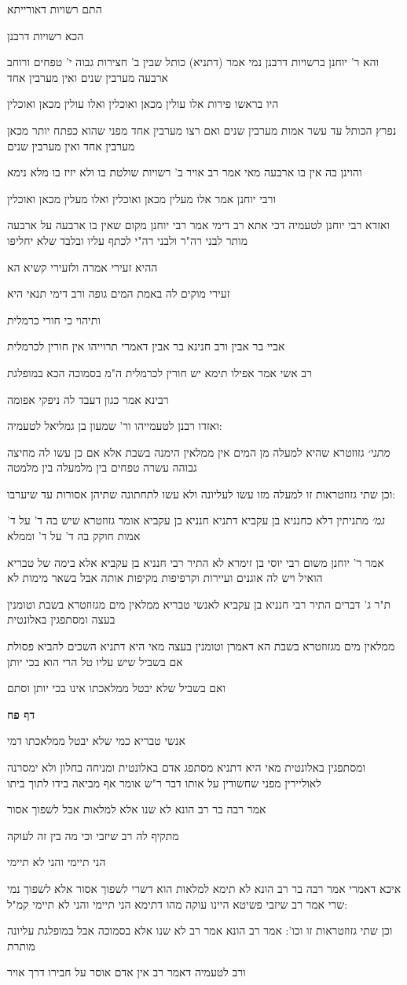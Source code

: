 \documentclass[12pt, openany]{book}
\newcommand{\sethebfont}{
\fontsize{10.5pt}{21.0pt} \selectfont
}
\newcommand{\textblock}[1]{
{\sethebfont #1\\}	
}
\newcommand{\sectname}{}
\newcommand{\newsection}[1]{
	\addcontentsline{toc}{section}{#1}
	\renewcommand{\sectname}{#1}	
	\vspace{-\baselineskip}
	\begin{center}
		\textbf{%
\fontsize{16pt}{16pt}\selectfont
			#1}
	\end{center}
	\vspace{-\baselineskip}
	\nopagebreak
}
\begin{document}
\textblock{התם רשויות דאורייתא}
\textblock{הכא רשויות דרבנן}
\textblock{והא ר' יוחנן ברשויות דרבנן נמי אמר (דתניא) כותל שבין ב' חצירות גבוה י' טפחים ורוחב ארבעה מערבין שנים ואין מערבין אחד}
\textblock{היו בראשו פירות אלו עולין מכאן ואוכלין ואלו עולין מכאן ואוכלין}
\textblock{נפרץ הכותל עד עשר אמות מערבין שנים ואם רצו מערבין אחד מפני שהוא כפתח יותר מכאן מערבין אחד ואין מערבין שנים}
\textblock{והוינן בה אין בו ארבעה מאי אמר רב אויר ב' רשויות שולטת בו ולא יזיז בו מלא נימא}
\textblock{ורבי יוחנן אמר אלו מעלין מכאן ואוכלין ואלו מעלין מכאן ואוכלין}
\textblock{ואזדא רבי יוחנן לטעמיה דכי אתא רב דימי אמר רבי יוחנן מקום שאין בו ארבעה על ארבעה מותר לבני רה"ר ולבני רה"י לכתף עליו ובלבד שלא יחליפו}
\textblock{ההיא זעירי אמרה ולזעירי קשיא הא}
\textblock{זעירי מוקים לה באמת המים גופה ורב דימי תנאי היא}
\textblock{ותיהוי כי חורי כרמלית}
\textblock{אביי בר אבין ורב חנינא בר אבין דאמרי תרוייהו אין חורין לכרמלית}
\textblock{רב אשי אמר אפילו תימא יש חורין לכרמלית ה"מ בסמוכה הכא במופלגת}
\textblock{רבינא אמר כגון דעבד לה ניפקי אפומה}
\textblock{ואזדו רבנן לטעמייהו ור' שמעון בן גמליאל לטעמיה:}
\textblock{{\large\emph{מתני׳}} גזוזטרא שהיא למעלה מן המים אין ממלאין הימנה בשבת אלא אם כן עשו לה מחיצה גבוהה עשרה טפחים בין מלמעלה בין מלמטה}
\textblock{וכן שתי גזוזטראות זו למעלה מזו עשו לעליונה ולא עשו לתחתונה שתיהן אסורות עד שיערבו:}
\textblock{{\large\emph{גמ׳}} מתניתין דלא כחנניא בן עקביא דתניא חנניא בן עקביא אומר גזוזטרא שיש בה ד' על ד' אמות חוקק בה ד' על ד' וממלא}
\textblock{אמר ר' יוחנן משום רבי יוסי בן זימרא לא התיר רבי חנניא בן עקביא אלא בימה של טבריא הואיל ויש לה אוגנים ועיירות וקרפיפות מקיפות אותה אבל בשאר מימות לא}
\textblock{ת"ר ג' דברים התיר רבי חנניא בן עקביא לאנשי טבריא ממלאין מים מגזוזטרא בשבת וטומנין בעצה ומסתפגין באלונטית}
\textblock{ממלאין מים מגזוזטרא בשבת הא דאמרן וטומנין בעצה מאי היא דתניא השכים להביא פסולת אם בשביל שיש עליו טל הרי הוא בכי יותן}
\textblock{ואם בשביל שלא יבטל ממלאכתו אינו בכי יותן וסתם}
\newsection{דף פח}
\textblock{אנשי טבריא כמי שלא יבטל ממלאכתו דמי}
\textblock{ומסתפגין באלונטית מאי היא דתניא מסתפג אדם באלונטית ומניחה בחלון ולא ימסרנה לאוליירין מפני שחשודין על אותו דבר ר"ש אומר אף מביאה בידו לתוך ביתו}
\textblock{אמר רבה בר רב הונא לא שנו אלא למלאות אבל לשפוך אסור}
\textblock{מתקיף לה רב שיזבי וכי מה בין זה לעוקה}
\textblock{הני תיימי והני לא תיימי}
\textblock{איכא דאמרי אמר רבה בר רב הונא לא תימא למלאות הוא דשרי לשפוך אסור אלא לשפוך נמי שרי אמר רב שיזבי פשיטא היינו עוקה מהו דתימא הני תיימי והני לא תיימי קמ"ל:}
\textblock{וכן שתי גזוזטראות זו וכו': אמר רב הונא אמר רב לא שנו אלא בסמוכה אבל במופלגת עליונה מותרת}
\textblock{ורב לטעמיה דאמר רב אין אדם אוסר על חבירו דרך אויר}
\end{document}
